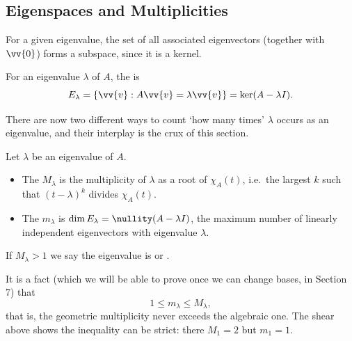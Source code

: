 \subsection{Eigenspaces and Multiplicities}

For a given eigenvalue, the set of all associated eigenvectors (together with $\vv{0}$) forms a subspace, since it is a kernel.

\begin{definition}[Eigenspace]
	For an eigenvalue $\lambda$ of $A$, the  is
	$$
	E_\lambda = \{ \vv{v} : A \vv{v} = \lambda \vv{v}\} = \ker(A - \lambda I).
	$$
\end{definition}

There are now two different ways to count `how many times' $\lambda$ occurs as an eigenvalue, and their interplay is the crux of this section.

\begin{definition}
	Let $\lambda$ be an eigenvalue of $A$.
	\begin{itemize}
		\item The  $M_\lambda$ is the multiplicity of $\lambda$ as a root of $\chi_A(t)$, i.e.\ the largest $k$ such that $(t - \lambda)^k$ divides $\chi_A(t)$.
		\item The  $m_\lambda$ is $\dim E_\lambda = \nullity(A - \lambda I)$, the maximum number of linearly independent eigenvectors with eigenvalue $\lambda$.
	\end{itemize}
	If $M_\lambda > 1$ we say the eigenvalue is  or .
\end{definition}

It is a fact (which we will be able to prove once we can change bases, in Section 7) that
$$
1 \leq m_\lambda \leq M_\lambda,
$$
that is, the geometric multiplicity never exceeds the algebraic one. The shear above shows the inequality can be strict: there $M_1 = 2$ but $m_1 = 1$.

